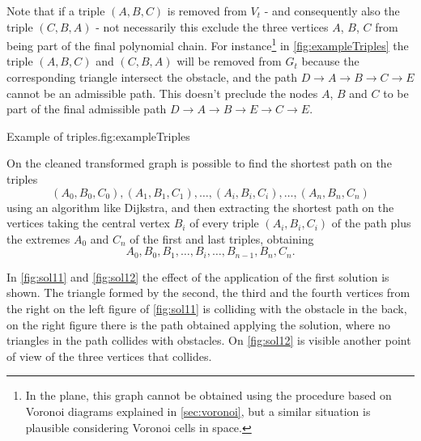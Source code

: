 \documentclass[dissertation.tex]{subfiles}
\begin{document}
Note that if a triple $(A,B,C)$ is removed from $V_t$ - and
consequently also the triple $(C,B,A)$ - not necessarily this exclude
the three vertices $A$, $B$, $C$ from being part of the final
polynomial chain. For instance\footnote{In the plane, this graph cannot be
  obtained using the procedure based on Voronoi diagrams explained in
  \cref{sec:voronoi}, but a similar situation is plausible
  considering Voronoi cells in space.} in
\cref{fig:exampleTriples} the triple
$(A,B,C)$ and $(C,B,A)$ will be removed from $G_t$ because
the corresponding triangle intersect the obstacle, and the path
$D\rightarrow A\rightarrow B\rightarrow C\rightarrow E$ cannot be an
admissible path. This doesn't preclude the nodes $A$, $B$ and $C$ to be part
of the final admissible path $D\rightarrow A\rightarrow B\rightarrow E\rightarrow C\rightarrow E$.
\begin{myfig}{Example of triples.}{fig:exampleTriples}
\end{myfig}

On the cleaned transformed graph is possible to find the shortest path on the
triples
$$
(A_0,B_0,C_0), (A_1,B_1,C_1),\dots,(A_i,B_i,C_i),\dots,(A_n,B_n,C_n)
$$
 using
an algorithm like Dijkstra, and then extracting the shortest
path on the vertices taking the central vertex $B_i$ of every
triple $(A_i,B_i,C_i)$ of the path plus the extremes $A_0$ and $C_n$
of the first and last triples, obtaining
$$
A_0,B_0,B_1,\dots,B_i,\dots,B_{n-1},B_n,C_n.
$$

In \cref{fig:sol11} and \cref{fig:sol12} the effect of the
application of the first solution is shown. The triangle formed by the second,
the third and the
fourth vertices from the right on the left figure of \cref{fig:sol11}
is colliding with the obstacle in the back, on the right figure there
is the path obtained applying the solution, where no triangles in the
path collides with obstacles. On \cref{fig:sol12} is visible another
point of view of the three vertices that collides.
\end{document}
